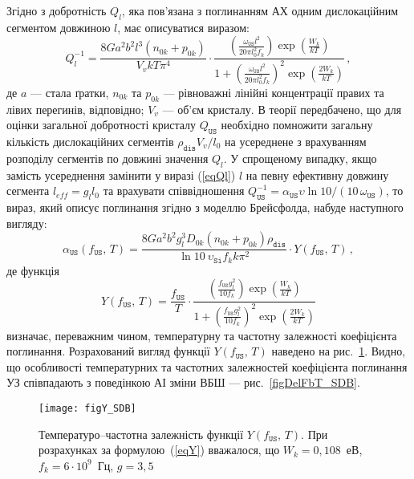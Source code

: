 Згідно з \cite{Brailsford} добротність $Q_l$, яка пов'язана з поглинанням АХ одним дислокаційним сегментом довжиною $l$, має описуватися виразом:
\begin{equation}
\label{eqQl}
Q_l^{-1}=\frac{8Ga^2b^2l^3(n_{0k}+p_{0k})}{V_vkT\pi^4}\cdot
\frac{\left(\frac{\omega_\mathtt{US} l^2}{20\pi l_0^2f_k}\right)\exp{\left(\frac{W_k}{kT}\right)}}
{1+\left(\frac{\omega_\mathtt{US} l^2}{20\pi l_0^2f_k}\right)^2\exp{\left(\frac{2W_k}{kT}\right)}}\,,
\end{equation}
де $a$ --- стала ґратки,
$n_{0k}$ та $p_{0k}$ --- рівноважні лінійні концентрації правих та лівих перегинів, відповідно;
$V_v$ --- об'єм кристалу.
В теорії передбачено, що для оцінки загальної добротності кристалу $Q_\mathtt{US}$ необхідно
помножити загальну кількість дислокаційних сегментів $\rho_\mathtt{dis}V_v/l_0$
на усереднене з врахуванням розподілу сегментів по довжині значення $Q_l$.
У спрощеному випадку, якщо замість усереднення замінити у виразі (\ref{eqQl}) $l$
на певну ефективну довжину сегмента \mbox{$l_{eff} = g_l l_0$} та врахувати співвідношення $Q_\mathtt{US}^{-1} = \alpha_\mathtt{US}\upsilon\ln{10}/(10 \,\omega_\mathtt{US})$, то вираз, який описує поглинання згідно з моделлю Брейсфолда, набуде наступного вигляду:
\begin{equation}
\label{eqAlpaBr}
\alpha_\mathtt{US}(f_\mathtt{US},\,T)=\frac{8Ga^2b^2g_l^3D_{0k}(n_{0k}+p_{0k})\rho_\mathtt{dis}}{\ln{10}\:\upsilon_\mathtt{Si} f_k k\pi^2}\cdot Y(f_\mathtt{US},\,T)\,,
\end{equation}
де функція
\begin{equation}
\label{eqY}
Y(f_\mathtt{US},\,T)=\frac{f_\mathtt{US}}{T}\cdot\frac{\left(\frac{f_\mathtt{US} g_l^2}{10 f_k}\right)\exp{\left(\frac{W_k}{kT}\right)}}
{1+\left(\frac{f_\mathtt{US} g_l^2}{10 f_k}\right)^2\exp{\left(\frac{2W_k}{kT}\right)}}
\end{equation}
визначає, переважним чином, температурну та частотну залежності коефіцієнта поглинання.
Розрахований вигляд функції $Y(f_\mathtt{US},\,T)$ наведено на рис.~\ref{figY_SDB}.
Видно, що особливості температурних та частотних залежностей коефіцієнта поглинання УЗ співпадають
з поведінкою АІ зміни ВБШ --- рис.~\ref{figDelFbT_SDB}.


\begin{figure}
\center
\texttt{[image: figY\_SDB]}
\caption{\label{figY_SDB}
Температуро--частотна залежність функції $Y(f_\mathtt{US},\,T)$.
При розрахунках за формулою~(\ref{eqY}) вважалося, що
$W_k=0,108$~еВ, $f_k=6\cdot10^9$~Гц, $g=3,5$
}%
\end{figure}

